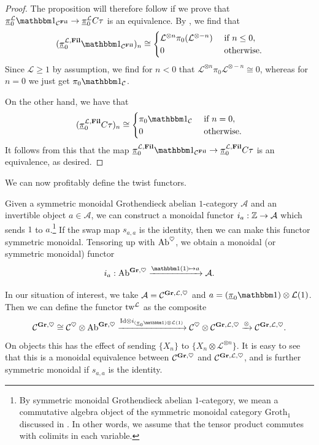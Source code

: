 \begin{proof}
  The proposition will therefore follow if we prove that $\piu_{0} ^{\mathcal{L}} \o_{\CC^{\Fil}} \to \piu_0 ^{\mathcal{L}} C\tau$ is an equivalence.
  By , we find that
  \[(\piu_{0} ^{\mathcal{L}, \Fil} \o_{\CC^{\Fil}})_n \cong \begin{cases} \mathcal{L}^{\otimes n} \pi_0 (\mathcal{L} ^{\otimes -n}) & \text{ if } n \leq 0, \\ 0 & \text{ otherwise.} \end{cases}\]
    Since $\mathcal{L} \geq 1$ by assumption, we find for $n < 0$ that $\mathcal{L}^{\otimes n} \pi_0 \mathcal{L} ^{\otimes -n} \cong 0$, whereas for $n=0$ we just get $\pi_0 \o_{\CC}$.

  On the other hand, we have that
  \[(\piu_0 ^{\mathcal{L}, \Fil} C\tau)_n \cong \begin{cases} \pi_0 \o_{\CC} & \text{ if } n = 0, \\ 0 & \text{ otherwise.} \end{cases}\]
  It follows from this that the map $\piu_{0} ^{\mathcal{L}, \Fil} \o_{\CC^{\Fil}} \to \piu_0 ^{\mathcal{L}, \Fil} C\tau$ is an equivalence, as desired.
\end{proof}

We can now profitably define the twist functors.

\begin{cnstr} \label{cnstr:twist}
  Given a symmetric monoidal Grothendieck abelian $1$-category $\mathcal{A}$ and an invertible object $a \in \mathcal{A}$, we can construct a monoidal functor
  $i_a : \mathbb{Z} \to \mathcal{A}$ which sends $1$ to $a$.\footnote{By symmetric monoidal Grothendieck abelian $1$-category, we mean a commutative algebra object of the symmetric monoidal category $\mathrm{Groth}_1$ discussed in . In other words, we assume that the tensor product commutes with colimits in each variable.}
  If the swap map $s_{a,a}$ is the identity, then we can make this functor symmetric monoidal.
  Tensoring up with $\mathrm{Ab}^{\heartsuit}$, we obtain a monoidal (or symmetric monoidal) functor
  \[ i_a : \Ab^{\Gr, \heartsuit} \xrightarrow{\o(1) \mapsto a} \mathcal{A}. \]
  
  In our situation of interest, we take $\mathcal{A} = \mathcal{C}^{\operatorname{\mathbf{Gr}}, \mathcal{L}, \heartsuit}$ and $a = (\piu_0 \o) \otimes \mathcal{L}(1)$. Then we can define the functor $\mathrm{tw}^{\mathcal{L}}$ as the composite
  \[ \CC^{\Gr, \heartsuit} \cong \CC^\heartsuit \otimes \Ab^{\Gr, \heartsuit} \xrightarrow{\mathrm{Id} \otimes i_{(\piu_0 \o) \otimes \mathcal{L}(1)}} \CC^\heartsuit \otimes \CC^{\Gr, \mathcal{L}, \heartsuit} \xrightarrow{\otimes} \CC^{\Gr, \mathcal{L}, \heartsuit}. \]
  On objects this has the effect of sending $\{X_n\}$ to $\{X_n \otimes \mathcal{L}^{\otimes n}\}$.
  It is easy to see that this is a monoidal equivalence between $\mathcal{C}^{\operatorname{\mathbf{Gr}}, \heartsuit}$ and $\mathcal{C}^{\operatorname{\mathbf{Gr}}, \mathcal{L}, \heartsuit}$, and is further symmetric monoidal if $s_{a, a}$ is the identity. 
\end{cnstr}

